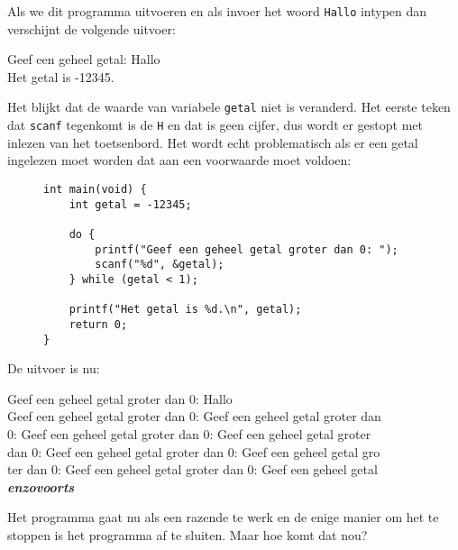 Als we dit programma uitvoeren en als invoer het woord \texttt{Hallo} intypen dan verschijnt de volgende uitvoer:

\begin{dosbox}
Geef een geheel getal: Hallo\\
Het getal is -12345.
\end{dosbox}

Het blijkt dat de waarde van variabele \texttt{getal} niet is veranderd. Het eerste teken dat \texttt{scanf} tegenkomt is de \texttt{H} en dat is geen cijfer, dus wordt er gestopt met inlezen van het toetsenbord. Het wordt echt problematisch als er een getal ingelezen moet worden dat aan een voorwaarde moet voldoen:

\begin{figure}[!ht]
\begin{lstlisting}[caption=Het inlezen van een geheel getal dat groter is dan 0.]
int main(void) {
    int getal = -12345;

    do {
        printf("Geef een geheel getal groter dan 0: ");
        scanf("%d", &getal);
    } while (getal < 1);

    printf("Het getal is %d.\n", getal);
    return 0;
}
\end{lstlisting}
\end{figure}


De uitvoer is nu:

\begin{dosbox}
Geef een geheel getal groter dan 0: Hallo\\
Geef een geheel getal groter dan 0: Geef een geheel getal groter dan\\
0: Geef een geheel getal groter dan 0: Geef een geheel getal groter \\
dan 0: Geef een geheel getal groter dan 0: Geef een geheel getal gro\\
ter dan 0: Geef een geheel getal groter dan 0: Geef een geheel getal\\
\bfseries\textsl{\textrm{enzovoorts}}
\textbf{}\end{dosbox}

Het programma gaat nu als een razende te werk en de enige manier om het te stoppen is het programma af te sluiten. Maar hoe komt dat nou?

